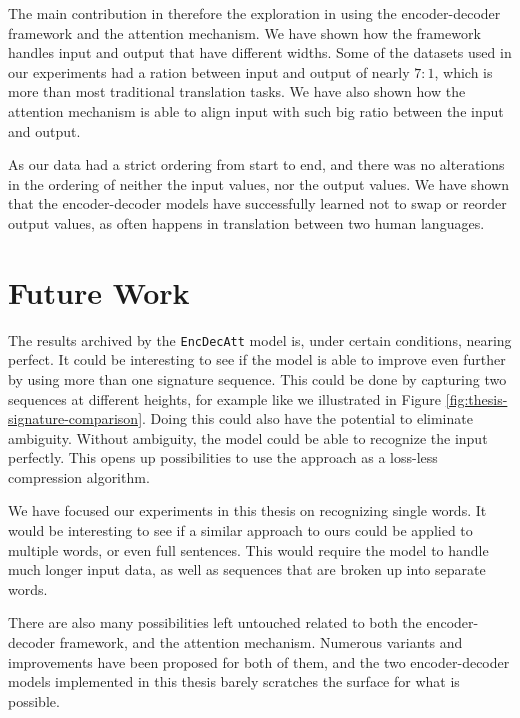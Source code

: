 The main contribution in therefore the exploration in using the encoder-decoder framework and the attention mechanism. We have shown how the framework handles input and output that have different widths. Some of the datasets used in our experiments had a ration between input and output of nearly \(7 : 1\), which is more than most traditional translation tasks. We have also shown how the attention mechanism is able to align input with such big ratio between the input and output. 

As our data had a strict ordering from start to end, and there was no alterations in the ordering of neither the input values, nor the output values. We have shown that the encoder-decoder models have successfully learned not to swap or reorder output values, as often happens in translation between two human languages.


\section{Future Work}
\label{sec:future_work}
The results archived by the {\tt EncDecAtt} model is, under certain conditions, nearing perfect. It could be interesting to see if the model is able to improve even further by using more than one signature sequence. This could be done by capturing two sequences at different heights, for example like we illustrated in Figure \ref{fig:thesis-signature-comparison}. Doing this could also have the potential to eliminate ambiguity. Without ambiguity, the model could be able to recognize the input perfectly. This opens up possibilities to use the approach as a loss-less compression algorithm.

We have focused our experiments in this thesis on recognizing single words. It would be interesting to see if a similar approach to ours could be applied to multiple words, or even full sentences. This would require the model to handle much longer input data, as well as sequences that are broken up into separate words.

There are also many possibilities left untouched related to both the encoder-decoder framework, and the attention mechanism. Numerous variants and improvements have been proposed for both of them, and the two encoder-decoder models implemented in this thesis barely scratches the surface for what is possible. 